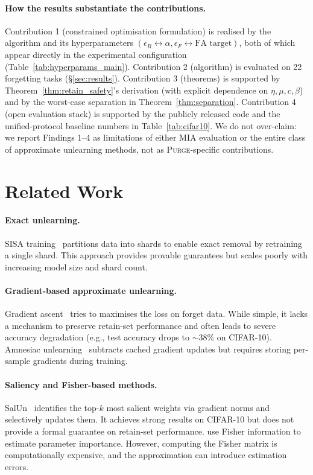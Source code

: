 \documentclass{article}
\newcommand{\ours}{\textsc{Purge}}
\begin{document}
{\paragraph{How the results substantiate the contributions.}
Contribution 1 (constrained optimisation formulation) is realised by the algorithm and its hyperparameters $(\epsilon_R \leftrightarrow \alpha, \epsilon_F \leftrightarrow \text{FA target})$, both of which appear directly in the experimental configuration (Table~\ref{tab:hyperparams_main}). Contribution 2 (algorithm) is evaluated on 22 forgetting tasks (\S\ref{sec:results}). Contribution 3 (theorems) is supported by Theorem~\ref{thm:retain_safety}'s derivation (with explicit dependence on $\eta, \mu, c, \beta$) and by the worst-case separation in Theorem~\ref{thm:separation}. Contribution 4 (open evaluation stack) is supported by the publicly released code and the unified-protocol baseline numbers in Table~\ref{tab:cifar10}. We do not over-claim: we report Findings 1--4 as limitations of either MIA evaluation or the entire class of approximate unlearning methods, not as \ours{}-specific contributions.
}

\section{Related Work}\label{sec:related}

\paragraph{Exact unlearning.}
SISA training~\cite{bourtoule2021sisa} partitions data into shards to enable exact removal by retraining a single shard.
This approach provides provable guarantees but scales poorly with increasing model size and shard count.

\paragraph{Gradient-based approximate unlearning.}
Gradient ascent~\cite{thudi2022unrolling} tries to maximises the loss on forget data.
While simple, it lacks a mechanism to preserve retain-set performance and often leads to severe accuracy degradation (e.g., test accuracy drops to $\sim$38\% on CIFAR-10).
Amnesiac unlearning~\cite{graves2021amnesiac} subtracts cached gradient updates but requires storing per-sample gradients during training.

\paragraph{Saliency and Fisher-based methods.}
SalUn~\cite{fan2024salun} identifies the top-$k$ most salient weights via gradient norms and selectively updates them.
It achieves strong results on CIFAR-10 but does not provide a formal guarantee on retain-set performance.
\citet{golatkar2020eternal,golatkar2021scrubbing} use Fisher information to estimate parameter importance.
However, computing the Fisher matrix is computationally expensive, and the approximation can introduce estimation errors.
\end{document}
